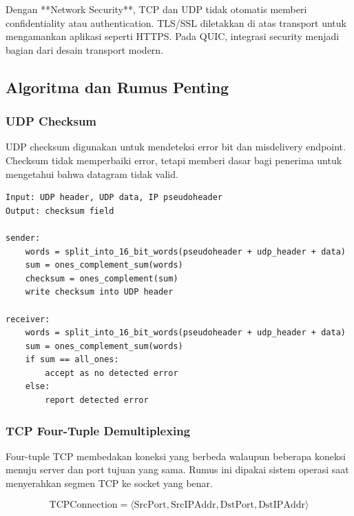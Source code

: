 Dengan **Network Security**, TCP dan UDP tidak otomatis memberi confidentiality atau authentication. TLS/SSL diletakkan di atas transport untuk mengamankan aplikasi seperti HTTPS. Pada QUIC, integrasi security menjadi bagian dari desain transport modern.

\subsection{Algoritma dan Rumus Penting}

\subsubsection{UDP Checksum}
\begin{jawab}
UDP checksum digunakan untuk mendeteksi error bit dan misdelivery endpoint. Checksum tidak memperbaiki error, tetapi memberi dasar bagi penerima untuk mengetahui bahwa datagram tidak valid.
\end{jawab}

\begin{lstlisting}[caption={Pseudocode UDP checksum}, label={lst:udp-checksum}]
Input: UDP header, UDP data, IP pseudoheader
Output: checksum field

sender:
    words = split_into_16_bit_words(pseudoheader + udp_header + data)
    sum = ones_complement_sum(words)
    checksum = ones_complement(sum)
    write checksum into UDP header

receiver:
    words = split_into_16_bit_words(pseudoheader + udp_header + data)
    sum = ones_complement_sum(words)
    if sum == all_ones:
        accept as no detected error
    else:
        report detected error
\end{lstlisting}

\subsubsection{TCP Four-Tuple Demultiplexing}
\begin{jawab}
Four-tuple TCP membedakan koneksi yang berbeda walaupun beberapa koneksi menuju server dan port tujuan yang sama. Rumus ini dipakai sistem operasi saat menyerahkan segmen TCP ke socket yang benar.
\end{jawab}

\begin{equation}
    \text{TCPConnection} =
    \langle \text{SrcPort}, \text{SrcIPAddr}, \text{DstPort}, \text{DstIPAddr} \rangle
    \label{eq:tcp-four-tuple}
\end{equation}

